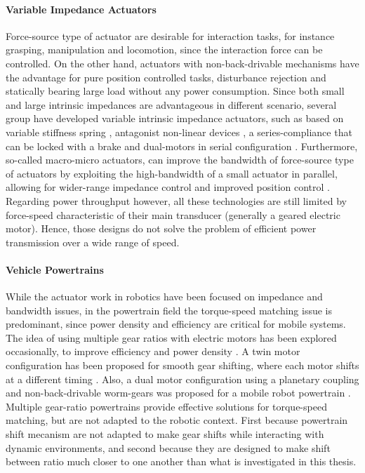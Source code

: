 \paragraph{Variable Impedance Actuators} Force-source type of actuator are desirable for interaction tasks, for instance grasping, manipulation and locomotion, since the interaction force can be controlled. On the other hand, actuators with non-back-drivable mechanisms have the advantage for pure position controlled tasks, disturbance rejection and statically bearing large load without any power consumption. Since both small and large intrinsic impedances are advantageous in different scenario, several group have developed variable intrinsic impedance actuators, such as based on variable stiffness spring \cite{tonietti_design_2005}, antagonist non-linear devices \cite{koganezawa_antagonistic_2006}, a series-compliance that can be locked with a brake \cite{leach_linear_2012} and dual-motors in serial configuration \cite{kim_serial-type_2010}. Furthermore, so-called macro-micro actuators, can improve the bandwidth of force-source type of actuators by exploiting the high-bandwidth of a small actuator in parallel, allowing for wider-range impedance control and improved position control \cite{morrell_parallel-coupled_1998}. Regarding power throughput however, all these technologies are still limited by force-speed characteristic of their main transducer (generally a geared electric motor). Hence, those designs do not solve the problem of efficient power transmission over a wide range of speed.

\paragraph{Vehicle Powertrains} While the actuator work in robotics have been focused on impedance and bandwidth issues, in the powertrain field the torque-speed matching issue is predominant, since power density and efficiency are critical for mobile systems. The idea of using multiple gear ratios with electric motors has been explored occasionally, to improve efficiency and power density \cite{mckeegan_antonovs_2011}. A twin motor configuration has been proposed for smooth gear shifting, where each motor shifts at a different timing \cite{bologna_electric_2014}. Also, a dual motor configuration using a planetary coupling and non-back-drivable worm-gears was proposed for a mobile robot powertrain \cite{lee_new_2012}. Multiple gear-ratio powertrains provide effective solutions for torque-speed matching, but are not adapted to the robotic context. First because powertrain shift mecanism are not adapted to make gear shifts while interacting with dynamic environments, and second because they are designed to make shift between ratio much closer to one another than what is investigated in this thesis.


